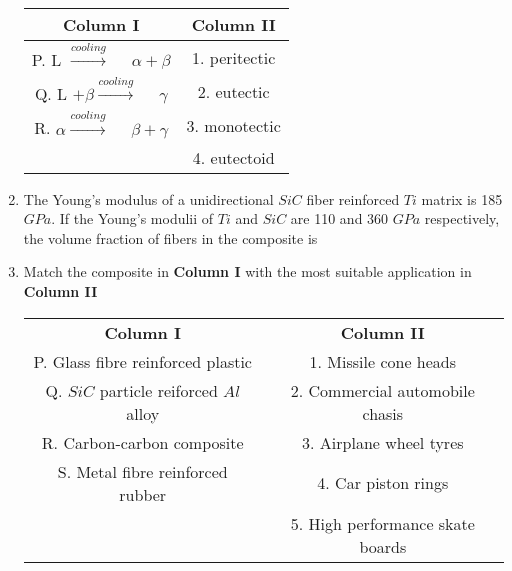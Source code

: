 \documentclass[journal,12pt,onecolumn]{IEEEtran}
\theoremstyle{remark}
\begin{document}
\begin{enumerate}
\begin{center}
    \begin{tabular}{|c|c|} 
        \hline
        \textbf{Column I} & \textbf{Column II}\\
        \hline
        P. L $\xrightarrow{cooling}$ $\quad \alpha + \beta$ & 1. peritectic\\
        \hline
        Q. L $+ \beta \xrightarrow{cooling}$ $\quad \gamma$ & 2. eutectic\\
        \hline
        R. $\alpha \xrightarrow{cooling}$ $\quad \beta + \gamma$ & 3. monotectic\\
        \hline
        \quad & 4. eutectoid\\
        \hline
   \end{tabular}
\end{center}
                \hfill{}
        \begin{enumerate}
        \end{enumerate}
    \item The Young's modulus of a unidirectional $SiC$ fiber reinforced $Ti$ matrix is 185 $GPa$.
        If the Young's modulii of $Ti$ and $SiC$ are 110 and 360 $GPa$ respectively, the volume fraction
        of fibers in the composite is 

        \hfill{}



    \item Match the composite in \textbf{Column I} with the most suitable application in 
        \textbf{Column II}
        \begin{center}
            \begin{tabular}{| c | c |}
        \hline
               \textbf{Column I}  & \textbf{Column II}\\
               P. Glass fibre reinforced plastic & 1.  Missile cone heads\\
                \hline
               Q. $SiC$ particle reiforced $Al$ alloy & 2.  Commercial automobile chasis\\
                \hline
               R. Carbon-carbon composite & 3. Airplane wheel tyres\\
                \hline
               S. Metal fibre reinforced rubber & 4. Car piston rings\\
                \hline
               \quad & 5. High performance skate boards\\


\end{tabular}
\end{center}
\end{enumerate}
\end{document}
